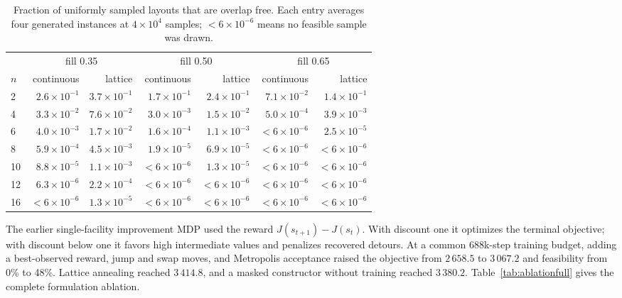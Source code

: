 \documentclass[11pt]{article}
\begin{document}
\begin{table}[htbp]
\centering
\caption{Fraction of uniformly sampled layouts that are overlap free. Each
entry averages four generated instances at $4\times10^4$ samples; $<6\times
10^{-6}$ means no feasible sample was drawn.}
\label{tab:sfeasvol}
\scriptsize
\setlength{\tabcolsep}{3pt}
\begin{tabular}{@{}lrrrrrr@{}}
\toprule
 & \multicolumn{2}{c}{fill 0.35} & \multicolumn{2}{c}{fill 0.50}
 & \multicolumn{2}{c}{fill 0.65} \\
\cmidrule(lr){2-3}\cmidrule(lr){4-5}\cmidrule(lr){6-7}
$n$ & continuous & lattice & continuous & lattice & continuous & lattice \\
\midrule
2  & $2.6\times10^{-1}$ & $3.7\times10^{-1}$ & $1.7\times10^{-1}$ & $2.4\times10^{-1}$ & $7.1\times10^{-2}$ & $1.4\times10^{-1}$ \\
4  & $3.3\times10^{-2}$ & $7.6\times10^{-2}$ & $3.0\times10^{-3}$ & $1.5\times10^{-2}$ & $5.0\times10^{-4}$ & $3.9\times10^{-3}$ \\
6  & $4.0\times10^{-3}$ & $1.7\times10^{-2}$ & $1.6\times10^{-4}$ & $1.1\times10^{-3}$ & $<6\times10^{-6}$ & $2.5\times10^{-5}$ \\
8  & $5.9\times10^{-4}$ & $4.5\times10^{-3}$ & $1.9\times10^{-5}$ & $6.9\times10^{-5}$ & $<6\times10^{-6}$ & $<6\times10^{-6}$ \\
10 & $8.8\times10^{-5}$ & $1.1\times10^{-3}$ & $<6\times10^{-6}$ & $1.3\times10^{-5}$ & $<6\times10^{-6}$ & $<6\times10^{-6}$ \\
12 & $6.3\times10^{-6}$ & $2.2\times10^{-4}$ & $<6\times10^{-6}$ & $<6\times10^{-6}$ & $<6\times10^{-6}$ & $<6\times10^{-6}$ \\
16 & $<6\times10^{-6}$ & $1.3\times10^{-5}$ & $<6\times10^{-6}$ & $<6\times10^{-6}$ & $<6\times10^{-6}$ & $<6\times10^{-6}$ \\
\bottomrule
\end{tabular}
\end{table}

The earlier single-facility improvement MDP used the reward
$J(s_{t+1})-J(s_t)$. With discount one it optimizes the terminal objective; with
discount below one it favors high intermediate values and penalizes recovered
detours. At a common 688k-step training budget, adding a best-observed reward,
jump and swap moves, and Metropolis acceptance raised the objective from
$2\,658.5$ to $3\,067.2$ and feasibility from 0\% to 48\%. Lattice annealing
reached $3\,414.8$, and a masked constructor without training reached
$3\,380.2$. Table~\ref{tab:ablationfull} gives the complete formulation ablation.
\end{document}
